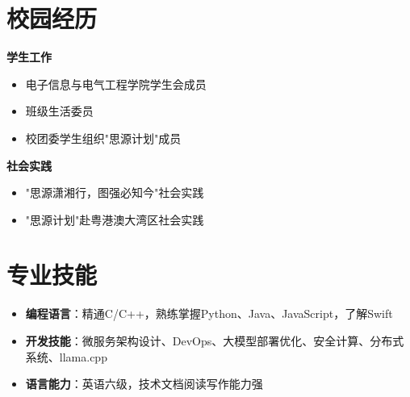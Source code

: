\documentclass[a4paper]{article}
\begin{document}
\section*{校园经历}
\begin{minipage}{0.48\textwidth}
\textbf{学生工作}
\begin{itemize}[leftmargin=*,itemsep=0.1em,topsep=0.1em]
\item 电子信息与电气工程学院学生会成员
\item 班级生活委员
\item 校团委学生组织"思源计划"成员
\end{itemize}
\end{minipage}
\begin{minipage}{0.48\textwidth}
\textbf{社会实践}
\begin{itemize}[leftmargin=*,itemsep=0.1em,topsep=0.1em]
\item "思源潇湘行，图强必知今"社会实践
\item "思源计划"赴粤港澳大湾区社会实践
\end{itemize}
\end{minipage}

\section*{专业技能}
\begin{itemize}[leftmargin=*,itemsep=0.2em,topsep=0.2em]
\item \textbf{编程语言}：精通C/C++，熟练掌握Python、Java、JavaScript，了解Swift
\item \textbf{开发技能}：微服务架构设计、DevOps、大模型部署优化、安全计算、分布式系统、llama.cpp
\item \textbf{语言能力}：英语六级，技术文档阅读写作能力强
\end{itemize}
\end{document}

